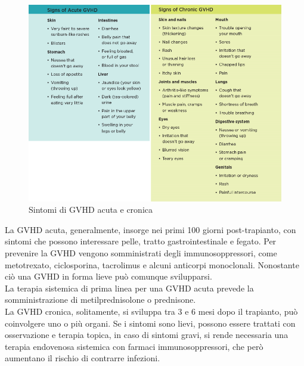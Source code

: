 \begin{figure}[H]
    \begin{center}
    \includegraphics[width=0.7\columnwidth]{img/SignsGVHD.png}
    \vspace{-3mm}
    \end{center}
    \caption{Sintomi di GVHD acuta e cronica
    \cite{img38}}
    \label{fig:FIGURE_3.17}
\end{figure}

La GVHD acuta, generalmente, insorge nei primi 100 giorni post-trapianto, con sintomi che possono interessare pelle, 
tratto gastrointestinale e fegato. Per prevenire la GVHD vengono somministrati degli immunosoppressori, come 
metotrexato, ciclosporina, tacrolimus e alcuni anticorpi monoclonali. 
Nonostante ciò una GVHD in forma lieve può comunque svilupparsi\cite{STEMCELLS}.\\
La terapia sistemica di prima linea per una GVHD acuta prevede la somministrazione di metilprednisolone o prednisone\cite{GVHD}.\\
La GVHD cronica, solitamente, si sviluppa tra 3 e 6 mesi dopo il trapianto, può coinvolgere uno o più organi. 
Se i sintomi sono lievi, possono essere trattati con osservazione e terapia topica, in caso di sintomi gravi, si rende 
necessaria una terapia endovenosa sistemica con farmaci immunosoppressori, che però aumentano il rischio 
di contrarre infezioni\cite{STEMCELLS}.\\

